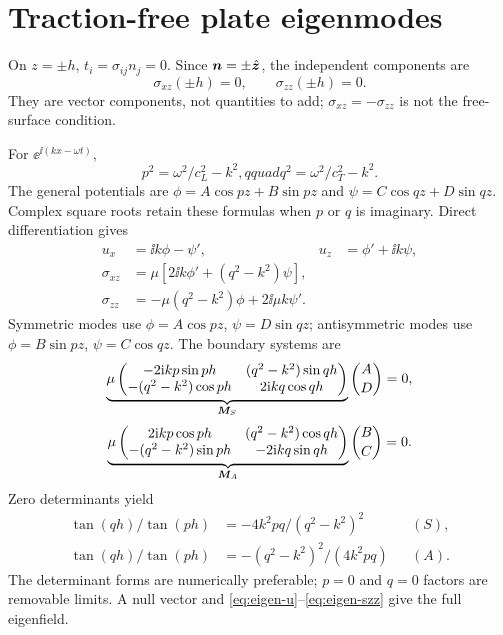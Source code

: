 \chapter{Traction-free plate eigenmodes}\label{ch:modes}
On $z=\pm h$, $t_i=\sigma_{ij}n_j=0$. Since
$\bm{n}=\pm\hat{\bm{z}}$, the independent components are
\begin{equation}\sigma_{xz}(\pm h)=0,\qquad\sigma_{zz}(\pm h)=0.
\label{eq:free-traction}\end{equation}
They are vector components, not quantities to add; $\sigma_{xz}=-\sigma_{zz}$ is
not the free-surface condition.

For $\ee^{\ii(kx-\omega t)}$,
\begin{equation}p^2=\omega^2/c_L^2-k^2,qquad q^2=\omega^2/c_T^2-k^2.\label{eq:pq}\end{equation}
The general potentials are $\phi=A\cos pz+B\sin pz$ and
$\psi=C\cos qz+D\sin qz$. Complex square roots retain these formulas when $p$
or $q$ is imaginary. Direct differentiation gives
\begin{align}
u_x&=\ii k\phi-\psi',&u_z&=\phi'+\ii k\psi,\label{eq:eigen-u}\\
\sigma_{xz}&=\mu[2\ii k\phi'+(q^2-k^2)\psi],\label{eq:eigen-sxz}\\
\sigma_{zz}&=-\mu(q^2-k^2)\phi+2\ii\mu k\psi'.\label{eq:eigen-szz}
\end{align}
Symmetric modes use $\phi=A\cos pz$, $\psi=D\sin qz$; antisymmetric modes use
$\phi=B\sin pz$, $\psi=C\cos qz$. The boundary systems are
\begin{equation}
\underbrace{\mu\begin{pmatrix}-2\mathrm{i} kp\sin ph&(q^2-k^2)\sin qh\\
-(q^2-k^2)\cos ph&2\mathrm{i} kq\cos qh\end{pmatrix}}_{\bm{M}_S}
\binom AD=0,\label{eq:matrix-S}
\end{equation}
\begin{equation}
\underbrace{\mu\begin{pmatrix}2\mathrm{i} kp\cos ph&(q^2-k^2)\cos qh\\
-(q^2-k^2)\sin ph&-2\mathrm{i} kq\sin qh\end{pmatrix}}_{\bm{M}_A}
\binom BC=0.\label{eq:matrix-A}
\end{equation}
Zero determinants yield
\begin{align}
\tan(qh)/\tan(ph)&=-4k^2pq/(q^2-k^2)^2&&(S),\label{eq:RL-S}\\
\tan(qh)/\tan(ph)&=-(q^2-k^2)^2/(4k^2pq)&&(A).\label{eq:RL-A}
\end{align}
The determinant forms are numerically preferable; $p=0$ and $q=0$ factors are
removable limits. A null vector and \cref{eq:eigen-u}--\cref{eq:eigen-szz} give
the full eigenfield.


